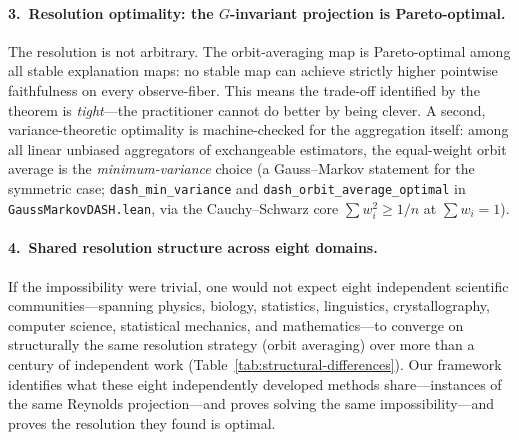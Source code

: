 \documentclass[11pt,a4paper]{article}
\begin{document}
\paragraph{3.\ Resolution optimality: the $G$-invariant projection is
Pareto-optimal.}
The resolution is not arbitrary.  The orbit-averaging map is Pareto-optimal
among all stable explanation maps: no stable map can achieve strictly higher
pointwise faithfulness on every observe-fiber.  This means the trade-off
identified by the theorem is \emph{tight}---the practitioner cannot do better
by being clever.  A second, variance-theoretic optimality is machine-checked
for the aggregation itself: among all linear unbiased aggregators of exchangeable
estimators, the equal-weight orbit average is the \emph{minimum-variance} choice
(a Gauss--Markov statement for the symmetric case; \texttt{dash\_min\_variance}
and \texttt{dash\_orbit\_average\_optimal} in \texttt{GaussMarkovDASH.lean}, via
the Cauchy--Schwarz core $\sum w_i^2 \geq 1/n$ at $\sum w_i = 1$).

\paragraph{4.\ Shared resolution structure across eight domains.}
If the impossibility were trivial, one would not expect eight independent
scientific communities---spanning physics, biology, statistics, linguistics,
crystallography, computer science, statistical mechanics, and
mathematics---to converge on structurally the same resolution strategy
(orbit averaging) over more than a century of independent work
(Table~\ref{tab:structural-differences}).
Our framework identifies what these eight independently developed methods
share---instances of the same Reynolds projection---and proves
solving the same impossibility---and proves the resolution they found is
optimal.
\end{document}
